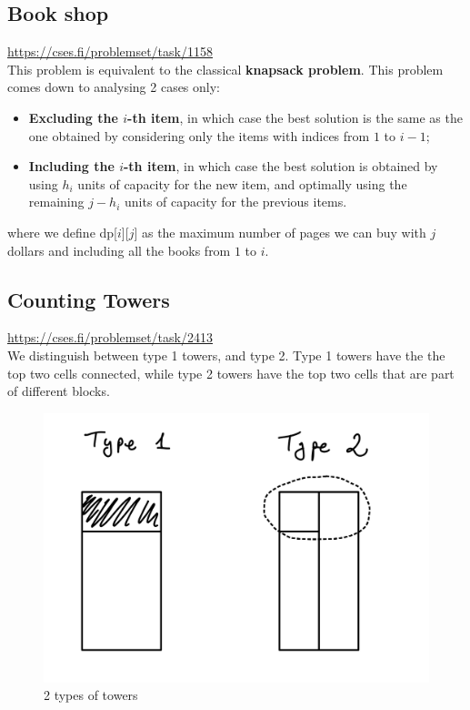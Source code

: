 \subsection{Book shop}
\url{https://cses.fi/problemset/task/1158} \\

This problem is equivalent to the classical \textbf{knapsack problem}. This problem comes down to analysing 2 cases only:
\\
\begin{itemize}
    \item \textbf{Excluding the $i$-th item}, in which case the best solution is the same as the one obtained by considering only the items with indices from $1$ to $i - 1$;
    
    \item \textbf{Including the $i$-th item}, in which case the best solution is obtained by using $h_i$ units of capacity for the new item, and optimally using the remaining $j - h_i$ units of capacity for the previous items.
\end{itemize}


\begin{center}
\end{center}

where we define dp[$i$][$j$] as the maximum number of pages we can buy with $j$ dollars and including all the books from $1$ to $i$.


\subsection{Counting Towers}
\url{https://cses.fi/problemset/task/2413} \\

We distinguish between type 1 towers, and type 2. Type 1 towers have the the top two cells connected, while type 2 towers have the top two cells that are part of different blocks.

\begin{figure}[!ht]
    \centering
    \includegraphics[width=0.5\linewidth]{Pictures/2-1.png}
    \caption{2 types of towers}
    \label{fig:21}
\end{figure}

